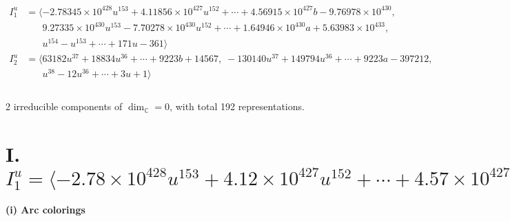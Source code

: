 \documentclass[1p]{elsarticle_modified}
\theoremstyle{definition}
\begin{document}
\begin{align*}
I^u_{1}&=\langle 
-2.78345\times10^{428} u^{153}+4.11856\times10^{427} u^{152}+\cdots+4.56915\times10^{427} b-9.76978\times10^{430},\\
\phantom{I^u_{1}}&\phantom{= \langle  }9.27335\times10^{430} u^{153}-7.70278\times10^{430} u^{152}+\cdots+1.64946\times10^{430} a+5.63983\times10^{433},\\
\phantom{I^u_{1}}&\phantom{= \langle  }u^{154}- u^{153}+\cdots+171 u-361\rangle \\
I^u_{2}&=\langle 
63182 u^{37}+18834 u^{36}+\cdots+9223 b+14567,\;-130140 u^{37}+149794 u^{36}+\cdots+9223 a-397212,\\
\phantom{I^u_{2}}&\phantom{= \langle  }u^{38}-12 u^{36}+\cdots+3 u+1\rangle \\
\\
\end{align*}
\raggedright * 2 irreducible components of $\dim_{\mathbb{C}}=0$, with total 192 representations.\\
\newpage
\renewcommand{\arraystretch}{1}
\centering \section*{I. $I^u_{1}= \langle -2.78\times10^{428} u^{153}+4.12\times10^{427} u^{152}+\cdots+4.57\times10^{427} b-9.77\times10^{430},\;9.27\times10^{430} u^{153}-7.70\times10^{430} u^{152}+\cdots+1.65\times10^{430} a+5.64\times10^{433},\;u^{154}- u^{153}+\cdots+171 u-361 \rangle$}
\flushleft \textbf{(i) Arc colorings}\\
\end{document}
